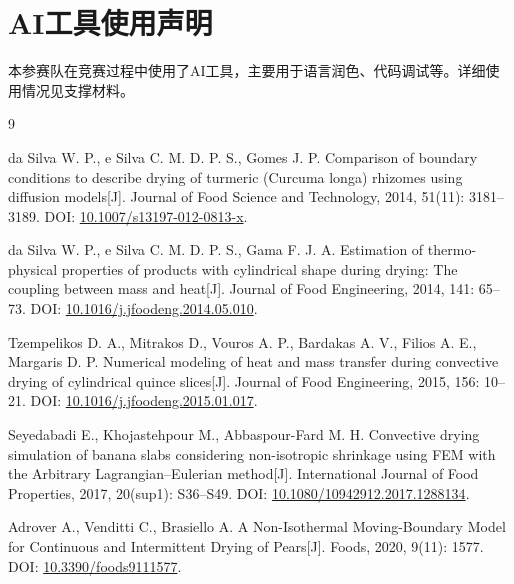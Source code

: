 \section*{AI工具使用声明}
本参赛队在竞赛过程中使用了AI工具，主要用于语言润色、代码调试等。详细使用情况见支撑材料。

\clearpage
\begin{thebibliography}{9}
\small\raggedright
{}
da Silva W. P., e Silva C. M. D. P. S., Gomes J. P.
Comparison of boundary conditions to describe drying of turmeric
(Curcuma longa) rhizomes using diffusion models[J].
Journal of Food Science and Technology, 2014, 51(11): 3181--3189.
DOI: \href{https://doi.org/10.1007/s13197-012-0813-x}{10.1007/s13197-012-0813-x}.

da Silva W. P., e Silva C. M. D. P. S., Gama F. J. A.
Estimation of thermo-physical properties of products with cylindrical
shape during drying: The coupling between mass and heat[J].
Journal of Food Engineering, 2014, 141: 65--73.
DOI: \href{https://doi.org/10.1016/j.jfoodeng.2014.05.010}{10.1016/j.jfoodeng.2014.05.010}.

Tzempelikos D. A., Mitrakos D., Vouros A. P., Bardakas A. V.,
Filios A. E., Margaris D. P.
Numerical modeling of heat and mass transfer during convective
drying of cylindrical quince slices[J].
Journal of Food Engineering, 2015, 156: 10--21.
DOI: \href{https://doi.org/10.1016/j.jfoodeng.2015.01.017}{10.1016/j.jfoodeng.2015.01.017}.

Seyedabadi E., Khojastehpour M., Abbaspour-Fard M. H.
Convective drying simulation of banana slabs considering non-isotropic
shrinkage using FEM with the Arbitrary Lagrangian--Eulerian method[J].
International Journal of Food Properties, 2017, 20(sup1): S36--S49.
DOI: \href{https://doi.org/10.1080/10942912.2017.1288134}{10.1080/10942912.2017.1288134}.

Adrover A., Venditti C., Brasiello A.
A Non-Isothermal Moving-Boundary Model for Continuous and
Intermittent Drying of Pears[J].
Foods, 2020, 9(11): 1577.
DOI: \href{https://doi.org/10.3390/foods9111577}{10.3390/foods9111577}.
\end{thebibliography}
